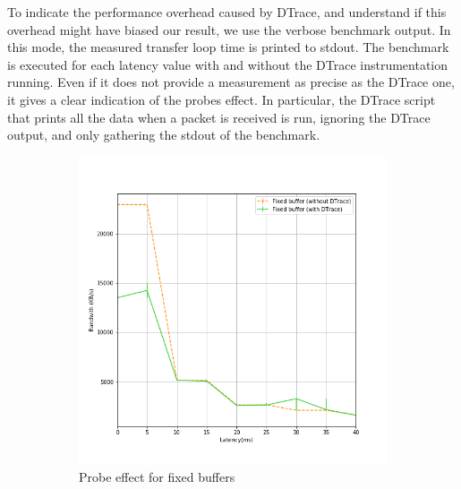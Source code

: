 \documentclass[a4paper,10pt]{article}
\begin{document}
To indicate the performance overhead caused by DTrace, and understand if this overhead might have biased our result, we use the verbose benchmark output. In this mode, the measured transfer loop time is printed to stdout. The benchmark is executed for each latency value with and without the DTrace instrumentation running. Even if it does not provide a measurement as precise as the DTrace one, it gives a clear indication of the probes effect.
In particular, the DTrace script that prints all the data when a packet is received is run, ignoring the DTrace output, and only gathering the stdout of the benchmark.
\begin{figure}[]
\begin{subfigure}{0.5\textwidth}
   \centering
   \includegraphics[width=\textwidth]{images/fixed_probe_effect.png}
   \caption{Probe effect for fixed buffers}
   \label{fig:fixed_probe}
\end{subfigure}
\qquad
\begin{subfigure}{0.5\textwidth}
   \centering

\end{subfigure}
\end{figure}
\end{document}
